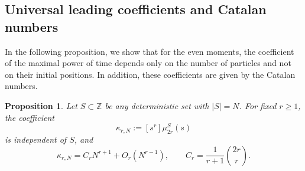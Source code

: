 \documentclass[11pt]{article}
\numberwithin{equation}{section}
\newtheorem{proposition}[theorem]{Proposition}
\newcommand{\1}{\mathbf 1}
\begin{document}
\subsection{Universal leading coefficients and Catalan numbers}
In the following proposition, we show that for the even moments, the coefficient of the maximal power of time
depends only on the number of particles and not on their initial positions. In addition, these coefficients are given by the Catalan numbers.

\begin{proposition}
\label{prop:catalan}
Let \(S\subset\mathbb Z\) be any deterministic set with \(|S|=N\).  For fixed
\(r\geq1\), the coefficient
\[
    \kappa_{r,N}:=[s^r]\mu_{2r}^S(s)
\]
is independent of \(S\), and
\begin{equation}
    \kappa_{r,N}
    =
    C_rN^{r+1}+O_r(N^{r-1}),
    \qquad
    C_r=\frac{1}{r+1}\binom{2r}{r}.
    \label{eq:catalan_leading_coefficient}
\end{equation}
\end{proposition}
\end{document}

